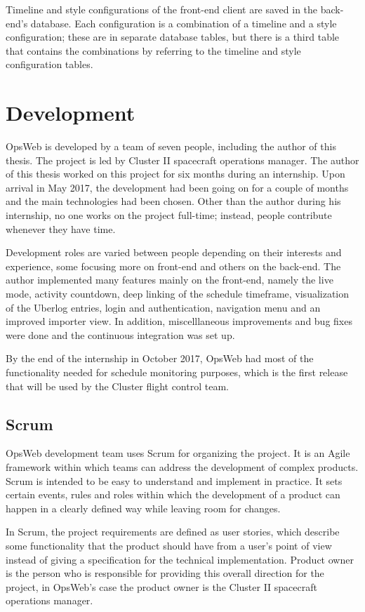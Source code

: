 Timeline and style configurations of the front-end client are saved in the back-end's database. Each configuration is a combination of a timeline and a style configuration; these are in separate database tables, but there is a third table that contains the combinations by referring to the timeline and style configuration tables.

\section{Development}
OpsWeb is developed by a team of seven people, including the author of this thesis. The project is led by Cluster II spacecraft operations manager. The author of this thesis worked on this project for six months during an internship. Upon arrival in May 2017, the development had been going on for a couple of months and the main technologies had been chosen. Other than the author during his internship, no one works on the project full-time; instead, people contribute whenever they have time.

Development roles are varied between people depending on their interests and experience, some focusing more on front-end and others on the back-end. The author implemented many features mainly on the front-end, namely the live mode, activity countdown, deep linking of the schedule timeframe, visualization of the Uberlog entries, login and authentication, navigation menu and an improved importer view. In addition, miscelllaneous improvements and bug fixes were done and the continuous integration was set up.

By the end of the internship in October 2017, OpsWeb had most of the functionality needed for schedule monitoring purposes, which is the first release that will be used by the Cluster flight control team.
\subsection{Scrum}
OpsWeb development team uses Scrum for organizing the project. It is an Agile framework within which teams can address the development of complex products. Scrum is intended to be easy to understand and implement in practice. It sets certain events, rules and roles within which the development of a product can happen in a clearly defined way while leaving room for changes.

In Scrum, the project requirements are defined as user stories, which describe some functionality that the product should have from a user's point of view instead of giving a specification for the technical implementation. Product owner is the person who is responsible for providing this overall direction for the project, in OpsWeb's case the product owner is the Cluster II spacecraft operations manager.

